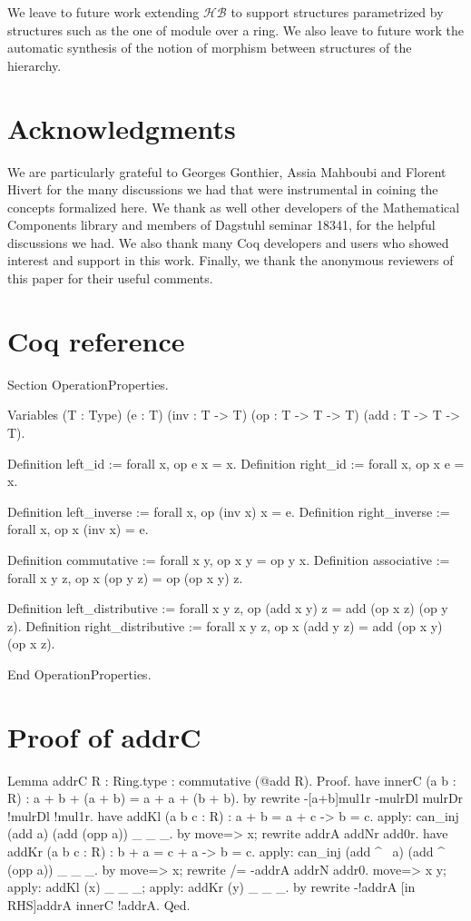 \documentclass[a4paper,UKenglish,cleveref, autoref]{lipics-v2019}
\newcommand{\HB}{\ensuremath{\mathcal{HB}}}
\theoremstyle{implem}
\theoremstyle{implem}
\theoremstyle{command}
\theoremstyle{commands}
\begin{document}
{{We leave to future work extending \HB{} to support structures parametrized
by structures such as the one of module over a ring.
We also leave to future
work the automatic synthesis of the notion of morphism between structures
of the hierarchy.

\section*{Acknowledgments}

We are particularly grateful to Georges Gonthier, Assia Mahboubi and
Florent Hivert for the many discussions we had that were instrumental
in coining the concepts formalized here. We thank as well other
developers of the Mathematical Components library and members of
Dagstuhl seminar 18341, for the helpful discussions we had. We also
thank many Coq developers and users who showed interest and support in
this work. Finally, we thank the anonymous reviewers of this paper for
their useful comments.


\newpage
\appendix

\section{Coq reference}
\label{sec:coq-reference}
\begin{coqcode}
Section OperationProperties.

Variables (T : Type) (e : T) (inv : T -> T) (op : T -> T -> T) (add : T -> T -> T).

Definition left_id  := forall x, op e x = x.
Definition right_id := forall x, op x e = x.

Definition left_inverse := forall x, op (inv x) x = e.
Definition right_inverse := forall x, op x (inv x) = e.

Definition commutative := forall x y, op x y = op y x.
Definition associative := forall x y z, op x (op y z) = op (op x y) z.

Definition left_distributive  := forall x y z, op (add x y) z = add (op x z) (op y z).
Definition right_distributive := forall x y z, op x (add y z) = add (op x y) (op x z).

End OperationProperties.
\end{coqcode}

\section{Proof of addrC}
\label{sec:proof-addrc}
\begin{coqcode}
Lemma addrC {R : Ring.type} : commutative (@add R).
Proof.
have innerC (a b : R) : a + b + (a + b) = a + a + (b + b).
  by rewrite -[a+b]mul1r -mulrDl mulrDr !mulrDl !mul1r.
have addKl (a b c : R) : a + b = a + c -> b = c.
  apply: can_inj (add a) (add (opp a)) _ _ _.
  by move=> x; rewrite addrA addNr add0r.
have addKr (a b c : R) : b + a = c + a -> b = c.
  apply: can_inj (add ^~ a) (add ^~ (opp a)) _ _ _.
  by move=> x; rewrite /= -addrA addrN addr0.
move=> x y; apply: addKl (x) _ _ _; apply: addKr (y) _ _ _.
by rewrite -!addrA [in RHS]addrA innerC !addrA.
Qed.
\end{coqcode}

}}
\end{document}

